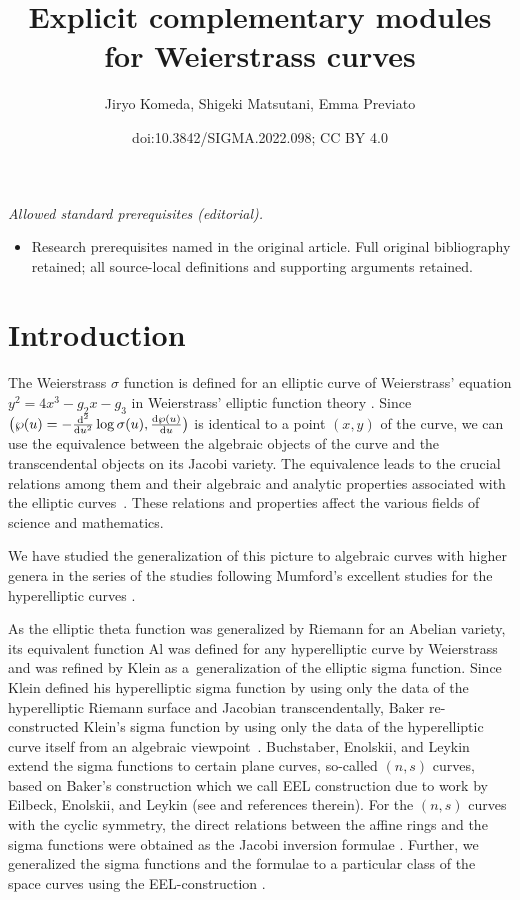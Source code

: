 \documentclass[10pt,a4paper]{amsart}
\title{Explicit complementary modules for Weierstrass curves}
\author{Jiryo Komeda, Shigeki Matsutani, Emma Previato}
\date{doi:10.3842/SIGMA.2022.098; CC BY 4.0}
\numberwithin{equation}{section}
\begin{document}
\maketitle
\noindent\textit{Allowed standard prerequisites (editorial).}\begin{itemize}
\item Research prerequisites named in the original article. Full original bibliography retained; all source-local definitions and supporting arguments retained.
\end{itemize}\medskip
\section{Introduction}\label{introduction}

The Weierstrass $\sigma$ function is defined for an elliptic curve of Weierstrass' equation $y^2 = 4 x^3 - g_2 x - g_3$ in Weierstrass' elliptic function theory \cite{WeiWV,WhittakerWatson}.
Since $\bigr(\wp(u)=-\frac{{\rm d}^2}{{\rm d} u^2}\log\sigma(u), \frac{{\rm d}\wp(u)}{{\rm d} u}\bigr)$ is identical to a point $(x,y)$ of the curve, we can use the equivalence between the algebraic objects of the curve and the transcendental objects on its Jacobi variety.
The equivalence leads to the crucial relations among them and their algebraic and analytic properties associated with the elliptic curves~\cite{WeiWV}. These relations and properties affect the various fields of science and mathematics.

We have studied the generalization of this picture to algebraic curves with higher genera in the series of the studies \cite{KM2020, KMP13, KMP16, KMP19} following Mumford's excellent studies for the hyperelliptic curves \cite{Mum81,Mum84}.

As the elliptic theta function was generalized by Riemann for an Abelian variety, its equivalent function Al was defined for any hyperelliptic curve by Weierstrass and was refined by Klein as a~generalization of the elliptic sigma function.
Since Klein defined his hyperelliptic sigma function by using only the data of the hyperelliptic Riemann surface and Jacobian transcendentally, Baker re-constructed Klein's sigma function by using only the data of the hyperelliptic curve itself from an algebraic viewpoint~\cite{Baker97}.
Buchstaber, Enolskii, and Leykin extend the sigma functions to certain plane curves, so-called $(n,s)$ curves, based on Baker's construction which we call EEL construction due to work by Eilbeck, Enolskii, and Leykin (see \cite{BEL20, EEL00} and references therein).
For the $(n,s)$ curves with the cyclic symmetry, the direct relations between the affine rings and the sigma functions were obtained as the Jacobi inversion formulae \cite{MP08, MP14}. Further, we generalized the sigma functions and the formulae to a particular class of the space curves using the EEL-construction \cite{KMP13, KMP19, MK13}.
\end{document}
